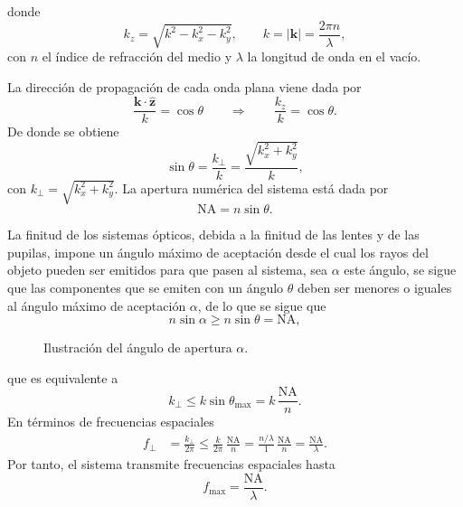 donde
\begin{equation}
k_z = \sqrt{k^2 - k_x^2 - k_y^2},
\qquad
k = \lvert\mathbf k\rvert = \frac{2\pi n}{\lambda},
\end{equation}
con \(n\) el índice de refracción del medio y \(\lambda\) la longitud de onda en el vacío.

La dirección de propagación de cada onda plana viene dada por
\begin{equation}
\frac{\mathbf k\cdot\hat{\mathbf z}}{k} = \cos\theta
\qquad\Rightarrow\qquad
\frac{k_z}{k} = \cos\theta.
\end{equation}
De donde se obtiene
\begin{equation}
\sin\theta
= \frac{k_\perp}{k}
= \frac{\sqrt{k_x^2 + k_y^2}}{k},
\end{equation}
con \(k_\perp = \sqrt{k_x^2 + k_y^2}\).
La apertura numérica del sistema está dada por \cite{bornwolf1999}
\begin{equation}
\mathrm{NA} = n \sin\theta.
\label{eq:def_NA}
\end{equation}

La finitud de los sistemas ópticos, debida a la finitud de las lentes y de las pupilas, impone
un ángulo máximo de aceptación desde el cual los rayos del objeto pueden ser emitidos para que pasen al sistema, 
sea $\alpha$ este ángulo, se sigue que las componentes que se emiten con un ángulo $\theta$ deben ser menores o iguales al ángulo máximo de aceptación $\alpha$, de lo que se sigue que
\begin{equation}
n\sin\alpha \ge n\sin\theta = \mathrm{NA},
\end{equation}

\begin{figure}[H]
    \centering
    
    \caption{Ilustración del ángulo de apertura $\alpha$.}
    \label{fig:na_geometry}
\end{figure}
que es equivalente a
\begin{equation}
k_\perp \le k \sin\theta_{\max}
= k\,\frac{\mathrm{NA}}{n}.
\end{equation}
En términos de frecuencias espaciales
\begin{equation}
\begin{aligned}
f_\perp &= \frac{k_\perp}{2\pi}
\le \frac{k}{2\pi}\,\frac{\mathrm{NA}}{n}
= \frac{n/\lambda}{1}\,\frac{\mathrm{NA}}{n}
= \frac{\mathrm{NA}}{\lambda}.
\end{aligned}
\end{equation}
Por tanto, el sistema transmite frecuencias espaciales hasta
\begin{equation}
f_{\max} = \frac{\mathrm{NA}}{\lambda}.
\end{equation}

